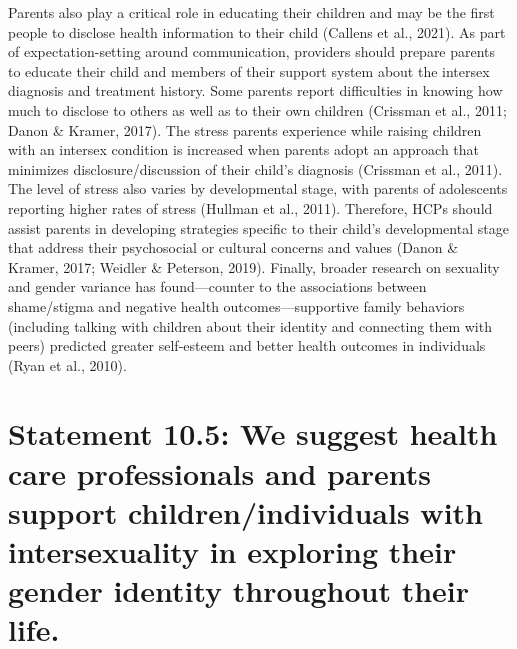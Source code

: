 \documentclass[
]{book}
\begin{document}
Parents also play a critical role in educating
their children and may be the first people to
disclose health information to their child (Callens
et al., 2021). As part of expectation-setting around
communication, providers should prepare parents
to educate their child and members of their support system about the intersex diagnosis and
treatment history. Some parents report difficulties
in knowing how much to disclose to others as
well as to their own children (Crissman et al.,
2011; Danon \& Kramer, 2017). The stress parents
experience while raising children with an intersex
condition is increased when parents adopt an
approach that minimizes disclosure/discussion of
their child's diagnosis (Crissman et al., 2011).
The level of stress also varies by developmental
stage, with parents of adolescents reporting higher
rates of stress (Hullman et al., 2011). Therefore,
HCPs should assist parents in developing strategies specific to their child's developmental stage
that address their psychosocial or cultural concerns and values (Danon \& Kramer, 2017; Weidler
\& Peterson, 2019). Finally, broader research on
sexuality and gender variance has found---counter
to the associations between shame/stigma and
negative health outcomes---supportive family
behaviors (including talking with children about
their identity and connecting them with peers)
predicted greater self-esteem and better health
outcomes in individuals (Ryan et al., 2010).

\hypertarget{statement-10.5-we-suggest-health-care-professionals-and-parents-support-childrenindividuals-with-intersexuality-in-exploring-their-gender-identity-throughout-their-life.}{%
\section*{Statement 10.5: We suggest health care professionals and parents support children/individuals with intersexuality in exploring their gender identity throughout their life.}\label{statement-10.5-we-suggest-health-care-professionals-and-parents-support-childrenindividuals-with-intersexuality-in-exploring-their-gender-identity-throughout-their-life.}}
\end{document}
